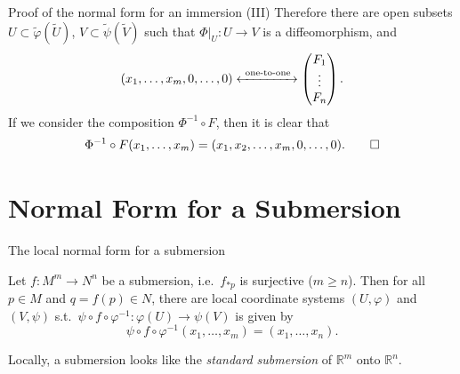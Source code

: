 \documentclass[10pt]{beamer}
\newcommand{\R}{\mathbb{R}}
\begin{document}
\begin{frame}{Proof of the normal form for an immersion (III)}
	Therefore there are open subsets
	$U \subset \widetilde{\varphi}(\widetilde{U})$,
	$V \subset \widetilde{\psi}(\widetilde{V})$ such that
	$\Phi\big|_U : U \to V$ is a diffeomorphism, and
	\[
		(x_1, \dots, x_m, 0, \dots, 0)
		\xleftrightarrow{\ \text{one-to-one}\ }
		\begin{pmatrix} F_1 \\ \vdots \\ F_n \end{pmatrix}.
	\]
	If we consider the composition $\Phi^{-1} \circ F$, then it is
	clear that
	\[
		\Phi^{-1} \circ F(x_1, \dots, x_m)
		= (x_1, x_2, \dots, x_m, 0, \dots, 0). \qedhere
	\]
\end{frame}

\section{Normal Form for a Submersion}

\begin{frame}{The local normal form for a submersion}
	\begin{theorem}
		Let $f : M^m \to N^n$ be a submersion, i.e.\ $f_{*p}$ is
		surjective ($m \ge n$). Then for all $p \in M$ and
		$q = f(p) \in N$, there are local coordinate systems
		$(U, \varphi)$ and $(V, \psi)$ s.t.\ $\psi \circ f \circ
			\varphi^{-1} : \varphi(U) \to \psi(V)$ is given by
		\[
			\psi \circ f \circ \varphi^{-1}(x_1, \dots, x_m)
			= (x_1, \dots, x_n).
		\]
	\end{theorem}
	\medskip
	Locally, a submersion looks like the \emph{standard submersion} of
	$\R^m$ onto $\R^n$.
\end{frame}
\end{document}
